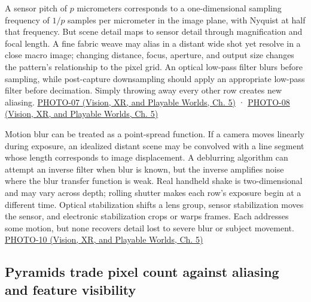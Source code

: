 A sensor pitch of \(p\) micrometers corresponds to a one-dimensional sampling frequency of \(1/p\) samples per micrometer in the image plane, with Nyquist at half that frequency. But scene detail maps to sensor detail through magnification and focal length. A fine fabric weave may alias in a distant wide shot yet resolve in a close macro image; changing distance, focus, aperture, and output size changes the pattern's relationship to the pixel grid. An optical low-pass filter blurs before sampling, while post-capture downsampling should apply an appropriate low-pass filter before decimation. Simply throwing away every other row creates new aliasing. \href{../07-Vision-XR-and-Playable-Worlds/main.pdf\#nameddest=04-visual-computing-ii-ch036-photo-07---photography-session-07}{PHOTO-07 (Vision, XR, and Playable Worlds, Ch. 5)} · \href{../07-Vision-XR-and-Playable-Worlds/main.pdf\#nameddest=04-visual-computing-ii-ch036-photo-08---photography-session-08}{PHOTO-08 (Vision, XR, and Playable Worlds, Ch. 5)}

Motion blur can be treated as a point-spread function. If a camera moves linearly during exposure, an idealized distant scene may be convolved with a line segment whose length corresponds to image displacement. A deblurring algorithm can attempt an inverse filter when blur is known, but the inverse amplifies noise where the blur transfer function is weak. Real handheld shake is two-dimensional and may vary across depth; rolling shutter makes each row's exposure begin at a different time. Optical stabilization shifts a lens group, sensor stabilization moves the sensor, and electronic stabilization crops or warps frames. Each addresses some motion, but none recovers detail lost to severe blur or subject movement. \href{../07-Vision-XR-and-Playable-Worlds/main.pdf\#nameddest=04-visual-computing-ii-ch036-photo-10---photography-session-10}{PHOTO-10 (Vision, XR, and Playable Worlds, Ch. 5)}

\subsection{Pyramids trade pixel count against aliasing and feature visibility}\label{03-visual-computing-i-ch004-pyramids-trade-pixel-count-against-aliasing-and-feature-visibility}

\hypertarget{03-visual-computing-i-ch004-pyramids-trade-pixel-count-against-aliasing-and-feature-visibility}{}

